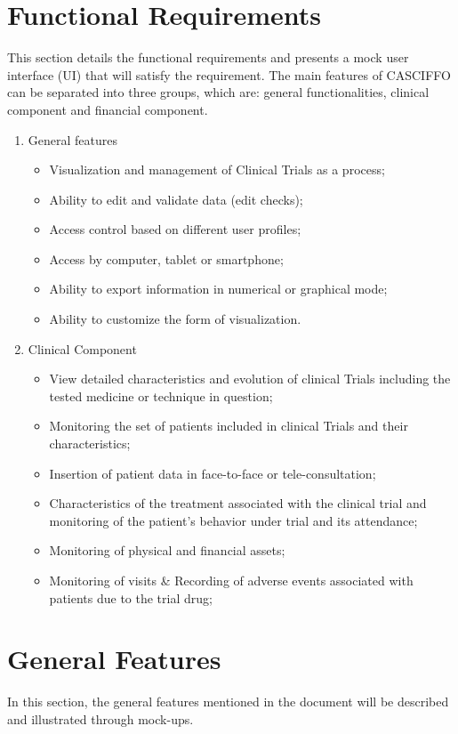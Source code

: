 \section{Functional Requirements}
\label{sec:functional-reqs}
This section details the functional requirements and presents a mock user interface (UI) that will satisfy the requirement.
The main features of CASCIFFO can be separated into three groups, which are: general functionalities, clinical component and financial component.  
\begin{enumerate}
    \item General features
        \begin{itemize}
            \item Visualization and management of Clinical Trials as a process; 
            \item Ability to edit and validate data (edit checks);
            \item Access control based on different user profiles; 
            \item Access by computer, tablet or smartphone; 
            \item Ability to export information in numerical or graphical mode; 
            \item Ability to customize the form of visualization.
        \end{itemize}
    \item Clinical Component
        \begin{itemize}
           \item View detailed characteristics and evolution of clinical Trials including the tested medicine or technique in question;
           \item Monitoring the set of patients included in clinical Trials and their characteristics;
           \item Insertion of patient data in face-to-face or tele-consultation;
           \item Characteristics of the treatment associated with the clinical trial and monitoring of the patient’s behavior under trial and its attendance;
           \item Monitoring of physical and financial assets;
           \item Monitoring of visits \& Recording of adverse events associated with patients due to the trial drug;
        \end{itemize}
\end{enumerate}

\section{General Features}
\label{sec:general-features}
In this section, the general features mentioned in the document will be described and illustrated through mock-ups.

